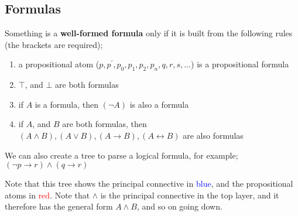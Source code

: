 \documentclass[a4paper, 12pt]{article}
\begin{document}
        \subsection*{Formulas}
            Something is a \textbf{well-formed formula} only if it is built from the following rules (the brackets are required);
            \begin{enumerate}[1.]
                \itemsep0em
                \item a propositional atom ($p, p^\prime, p_0, p_1, p_2, p_n, q, r, s, ...$) is a propositional formula
                \item $\top$, and $\bot$ are both formulas
                \item if $A$ is a formula, then $(\neg A)$ is also a formula
                \item if $A$, and $B$ are both formulas, then $(A \land B), (A \lor B), (A \rightarrow B), (A \leftrightarrow B)$ are also formulas
            \end{enumerate}
            We can also create a tree to parse a logical formula, for example; $(\neg p \rightarrow r) \land (q \rightarrow r)$

            \begin{center}
            \end{center}
            Note that this tree shows the principal connective in \textcolor{blue}{blue}, and the propositional atoms in \textcolor{red}{red}. Note that $\land$ is the principal connective in the top layer, and it therefore has the general form $A \land B$, and so on going down.
\end{document}
